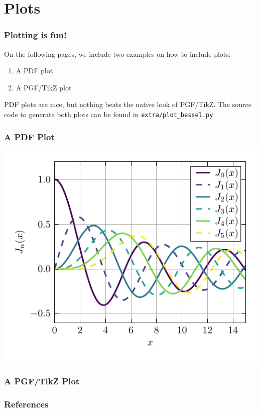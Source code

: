 \documentclass[pdf,smaller,aspectratio=43]{beamer}
\begin{document}
\section{Plots}
\label{sec:plots}

\begin{frame}
  \frametitle{Plotting is fun!}

  On the following pages, we include two examples on how to include plots:
  \begin{enumerate}
    \item A PDF plot
    \item A PGF/TikZ plot
  \end{enumerate}

  PDF plots are nice, but nothing beats the native look of PGF/TikZ. The source
  code to generate both plots can be found in \texttt{extra/plot\_bessel.py}
\end{frame}

\begin{frame}
  \frametitle{A PDF Plot}
  \begin{center}
    \includegraphics{./plots/bessel.pdf}
  \end{center}
\end{frame}

\begin{frame}
  \frametitle{A PGF/TikZ Plot}
  \begin{center}
    
  \end{center}
\end{frame}

\sectionimage{}
\begin{frame}[allowframebreaks]
  \frametitle{References}
  \renewcommand*{\bibfont}{\scriptsize}
  \printbibliography
\end{frame}
\end{document}
